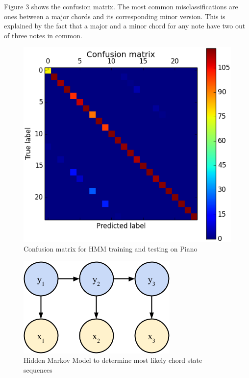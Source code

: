 \documentclass{article}
\begin{document}
Figure 3 shows the confusion matrix. The most common misclassifications are ones
between a major chords and its corresponding minor version. This is explained by
the fact that a major and a minor chord for any note have two out of three notes
in common.

\begin{figure}[ht]
\vskip 0.2in
\begin{center}
\centerline{\includegraphics[width=\columnwidth]{conf}}
\caption{Confusion matrix for HMM training and testing on Piano}
\label{icml-historical}
\end{center}
\vskip -0.2in
\end{figure}

\begin{figure}[ht]
\vskip 0.2in
\begin{center}
\centerline{\includegraphics[width=\columnwidth]{hmm}}
\caption{Hidden Markov Model to determine most likely chord state sequences}
\label{icml-historical}
\end{center}
\vskip -0.2in
\end{figure}
\end{document}
